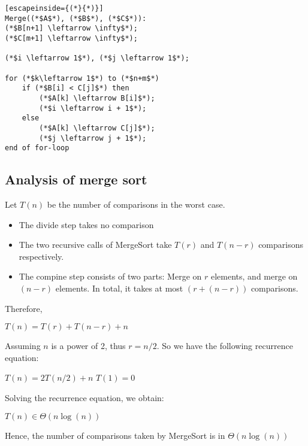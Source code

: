 \documentclass[a4paper]{article}
\begin{document}
\begin{lstlisting}[escapeinside={(*}{*)}]
Merge((*$A$*), (*$B$*), (*$C$*)):
(*$B[n+1] \leftarrow \infty$*);
(*$C[m+1] \leftarrow \infty$*);

(*$i \leftarrow 1$*), (*$j \leftarrow 1$*);

for (*$k\leftarrow 1$*) to (*$n+m$*)
	if (*$B[i] < C[j]$*) then 
		(*$A[k] \leftarrow B[i]$*);
		(*$i \leftarrow i + 1$*);
	else
		(*$A[k] \leftarrow C[j]$*);
		(*$j \leftarrow j + 1$*);
end of for-loop
\end{lstlisting}
\subsection{Analysis of merge sort}
Let $T(n)$ be the number of comparisons in the worst case.
\begin{itemize}
	\item The divide step takes no comparison
	\item The two recursive calls of MergeSort take $T(r)$ and $T(n-r)$ comparisons respectively.
	\item The compine step consists of two parts: Merge on $r$ elements, and merge on $(n-r)$ elements. In total, it takes at most $(r+(n-r))$ comparisons.
\end{itemize}
Therefore,
\begin{center}
	$T(n) = T(r) + T(n-r) + n$
\end{center}
Assuming $n$ is a power of 2, thus $r=n/2$. So we have the following recurrence equation:
\begin{center}
	$T(n) = 2T(n/2) + n$
	$T(1) = 0$
\end{center}
Solving the recurrence equation, we obtain:
\begin{center}
	$T(n) \in \Theta(n \log(n))$
\end{center}
Hence, the number of comparisons taken by MergeSort is in $\Theta(n \log(n))$
\end{document}
